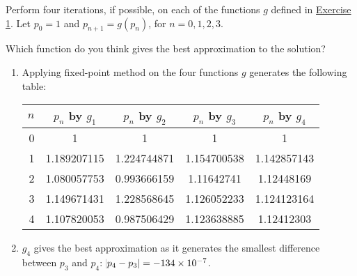 \documentclass[../../../../Assignments]{subfiles}
\begin{document}
\begin{exercise}
    \begin{tasks}
        \task Perform four iterations, if possible, on each of the functions
            \(g\) defined in \hyperref[exer:2.2.1]{Exercise 1}. Let \(p_0 = 1\)
            and \(p_{n + 1} = g(p_n)\), for \(n = 0, 1, 2, 3\).

        \task Which function do you think gives the best approximation to the
            solution?
    \end{tasks}
\end{exercise}

\begin{solution}
    \begin{enumerate}[label = \alph*)]
        \item Applying fixed-point method on the four functions \(g\) generates
            the following table:

            \begin{table}[H]
                \centering
                \begin{tabular}{r S[table-format=1.9] S[table-format=1.9] S[table-format=1.9] S[table-format=1.9]}
                    \toprule
                    \(n\)  & {\(p_n\) by \(g_1\)} & {\(p_n\) by \(g_2\)} & {\(p_n\) by \(g_3\)} & {\(p_n\) by \(g_4\)} \\
                      &  1                   &  1                   &  1                   &  1                   \\
                        1  &  1.189207115         &  1.224744871         &  1.154700538         &  1.142857143         \\
                        2  &  1.080057753         &  0.993666159         &  1.11642741          &  1.12448169          \\
                        3  &  1.149671431         &  1.228568645         &  1.126052233         &  1.124123164         \\
                        4  &  1.107820053         &  0.987506429         &  1.123638885         &  1.12412303          \\
                    \bottomrule
                \end{tabular}
            \end{table}

        \item \(g_4\) gives the best approximation as it generates the smallest
            difference between \(p_3\) and \(p_4\): \({\abs{p_4 - p_3} =
            \num{-134e-7}}\).
    \end{enumerate}
\end{solution}
\end{document}
